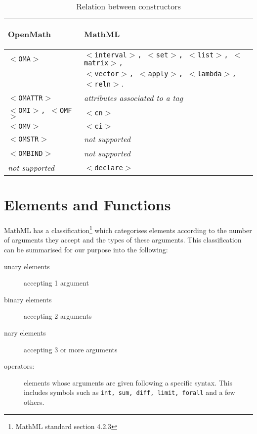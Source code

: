 \begin{table} 

\begin{center}

\begin{tabular}{|l|l|} 
\hline 
\label{const}

{\bf OpenMath} 			&	{\bf MathML} \\ \hline

\texttt{$<$OMA$>$}		&	\texttt{$<$interval$>$, $<$set$>$, $<$list$>$, $<$matrix$>$,}\\
				&	\texttt{$<$vector$>$, $<$apply$>$, $<$lambda$>$, $<$reln$>$}. \\
\texttt{$<$OMATTR$>$}		&	{\it attributes associated to a tag} \\
\texttt{$<$OMI$>$, $<$OMF$>$}	&	\texttt{$<$cn$>$} \\
\texttt{$<$OMV$>$}		&	\texttt{$<$ci$>$} \\
\texttt{$<$OMSTR$>$}		&	{\it not supported} \\
\texttt{$<$OMBIND$>$}		&	{\it not supported} \\
{\it not supported}		&	\texttt{$<$declare$>$} \\

\hline

\end{tabular}

\end{center}     
\caption{Relation between constructors} 

\end{table}     

\section{Elements and Functions}
\label{funcs}

MathML has a classification\footnote{MathML standard section 4.2.3}
which categorises elements according to the number of arguments they
accept and the types of these arguments.  This classification can be
summarised for our purpose into the following:

\begin{description}

\item[unary elements] accepting 1 argument

\item [binary elements] accepting 2 arguments

\item [nary elements] accepting 3 or more arguments

\item [operators:] elements whose arguments are given following a
specific syntax. This includes symbols such as {\tt int, sum, diff,
limit, forall} and a few others.

\end{description}

